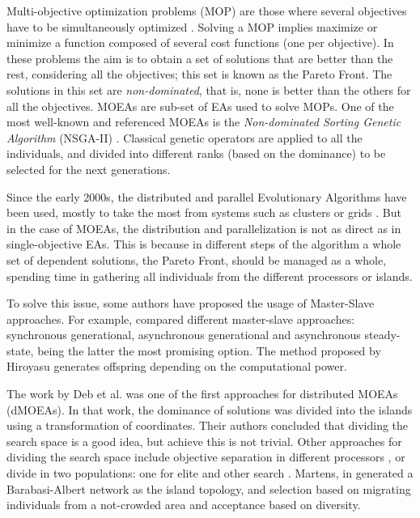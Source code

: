 \documentclass[Crown,sagev,times,doublespace]{sagej}
\begin{document}
Multi-objective optimization problems (MOP) are those where several objectives have to be simultaneously optimized \citep{Mora13paretobased}. Solving a MOP implies maximize or minimize a function composed of several cost functions (one per objective). In these problems the aim is to obtain a set of solutions that are better than the rest, considering all the objectives; this set is known as the Pareto Front. The solutions in this set are {\em non-dominated}, that is, none is better than the others for all the objectives. MOEAs are sub-set of EAs used to solve MOPs. One of the most well-known and referenced MOEAs \citep{Dorronsoro13superlinear} is the {\em Non-dominated Sorting Genetic Algorithm} (NSGA-II) \citep{Deb00NSGAII}. Classical genetic operators are applied to all the individuals, and divided into different ranks (based on the dominance) to be selected for the next generations.


Since the early 2000s, the distributed and parallel Evolutionary Algorithms have been used, mostly to take the most from systems such as clusters or grids \citep{Talbi08Parallel}. But in the case of MOEAs, the distribution and parallelization is not as direct as in single-objective EAs. This is because in different steps of the algorithm a whole set of dependent solutions, the Pareto Front, should be managed as a whole, spending time in gathering all individuals from the different processors or islands.

To solve this issue, some authors have proposed the usage of Master-Slave approaches. For example,  \citep{Durillo08masterslave} compared different master-slave approaches: synchronous generational, asynchronous generational and asynchronous steady-state, being the latter the most promising option. The method proposed by Hiroyasu \citep{Hiroyasu07discussion} generates offspring depending on the computational power.

The work by Deb et al. \citep{Deb03distributed} was one of the first approaches for distributed MOEAs (dMOEAs). In that work, the dominance of solutions was divided into the islands using a transformation of coordinates. Their authors concluded that dividing the search space is a good idea, but achieve this is not trivial. Other approaches for dividing the search space include objective separation in different processors \citep{Xiao03specialized}, or divide in two populations: one for elite and other search \citep{Wang09parallel}. Martens, in \citep{Martens13asynchronous} generated a Barabasi-Albert network as the island topology, and selection based on migrating individuals from a not-crowded area and acceptance based on diversity. 
\end{document}
